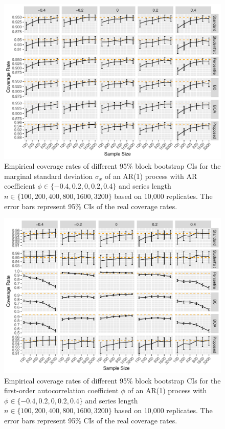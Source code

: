 \documentclass[12pt, letterpaper, titlepage]{article}
\begin{document}
\begin{figure}[tbp]
  \centering
  \includegraphics[width=\textwidth]{figures/plot_norm_sigma}
  \caption{Empirical coverage rates of different 95\% block bootstrap CIs for
    the marginal standard deviation $\sigma_x$ of an AR(1) 
    process with AR coefficient $\phi \in \{-0.4, 0.2, 0, 0.2, 0.4\}$ and
    series length $n \in \{100, 200, 400, 800, 1600, 3200\}$ based on 10,000
    replicates. The error bars represent 95\% CIs of the real coverage rates.}
  \label{fig:sigma}
\end{figure}


\begin{figure}[tbp]
  \centering
  \includegraphics[width=\textwidth]{figures/plot_norm_phi}
  \caption{Empirical coverage rates of different 95\% block bootstrap CIs for
    the first-order autocorrelation coefficient $\phi$ of an AR(1) process with
    $\phi \in \{-0.4, 0.2, 0, 0.2, 0.4\}$ and series length
    $n \in \{100, 200, 400, 800, 1600, 3200\}$ based on 10,000 replicates. The
    error bars represent 95\% CIs of the real coverage rates.}
  \label{fig:phi}
\end{figure}
\end{document}
